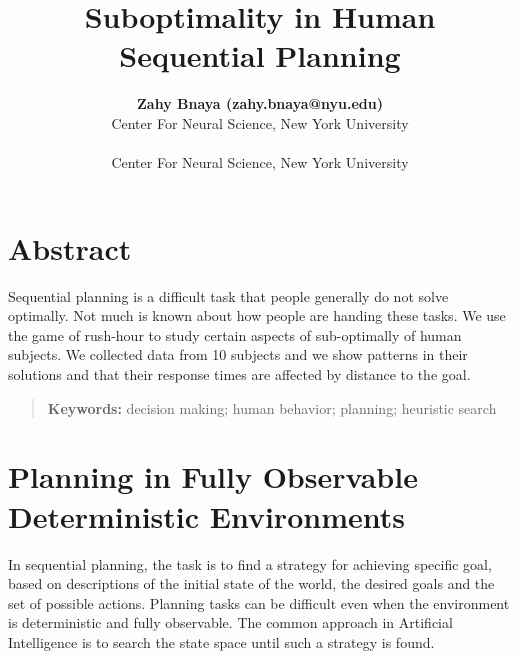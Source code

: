 \documentclass[10pt,letterpaper]{article}
\title{Suboptimality in Human Sequential Planning}
\author{{\large \bf Zahy Bnaya (zahy.bnaya@nyu.edu)} \\
Center For Neural Science, New York University\\
  \AND {\large \bf Weiji Ma (weiji.ma@nyu.edu)} \\
Center For Neural Science, New York University\\
}
\begin{document}
\maketitle

\section{Abstract} {\bf


	Sequential planning is a difficult task that people generally do not solve optimally. Not much is known about how people are handing these tasks. 
	We use the game of rush-hour to study certain aspects of sub-optimally of human subjects. We collected data from 10 subjects and we show patterns in their solutions and that their response times are affected by distance to the goal. 

}

\begin{quote}
\small
\textbf{Keywords:} 
decision making; human behavior; planning; heuristic search
\end{quote}

\section{Planning in Fully Observable Deterministic Environments}

In sequential planning, the task is to find a strategy for achieving specific goal, based on descriptions of the initial state of the world, the desired goals and the set of possible actions. Planning tasks can be difficult even when the environment is deterministic and fully observable.
The common approach in Artificial Intelligence is to search the state space until such a strategy is found.
\end{document}

